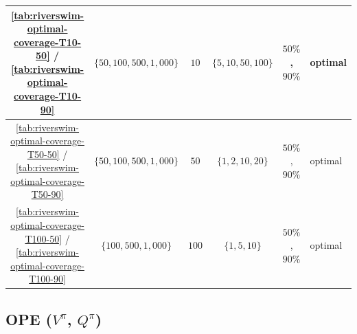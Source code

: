 \documentclass{article}
\numberwithin{equation}{section}
\begin{document}
\begin{table}[ht]
\begin{tabular}{|c|c|c|c|c|l|}
\hline
\ref{tab:riverswim-optimal-coverage-T10-50} / \ref{tab:riverswim-optimal-coverage-T10-90} & $\{50,100,500,1{,}000\}$ & $10$ & $\{5,10,50,100\}$ & $50\%$, $90\%$ & optimal \\
\hline
\ref{tab:riverswim-optimal-coverage-T50-50} / \ref{tab:riverswim-optimal-coverage-T50-90} & $\{50,100,500,1{,}000\}$ & $50$ & $\{1,2,10,20\}$ & $50\%$, $90\%$ & optimal \\
\hline
\ref{tab:riverswim-optimal-coverage-T100-50} / \ref{tab:riverswim-optimal-coverage-T100-90} & $\{100,500,1{,}000\}$ & $100$ & $\{1,5,10\}$ & $50\%$, $90\%$ & optimal \\
\hline
\end{tabular}
\end{table}
\subsection{OPE ($V^\pi$, $Q^\pi$)}
\label{app:ope-tables}
\end{document}
